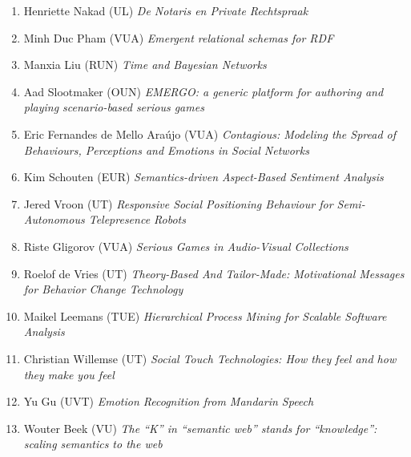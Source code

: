 \begin{multicols}{2}
\begin{scriptsize}
\begin{enumerate}[leftmargin=*,noitemsep,topsep=0pt,parsep=1pt,partopsep=0pt]
{}\item Henriette Nakad (UL) \textit{De Notaris en Private Rechtspraak 
}\item Minh Duc Pham (VUA) \textit{Emergent relational schemas for RDF 
}\item Manxia Liu (RUN) \textit{Time and Bayesian Networks 
}\item Aad Slootmaker (OUN) \textit{EMERGO: a generic platform for authoring and playing scenario-based serious games
}\item Eric Fernandes de Mello Araújo (VUA) \textit{Contagious: Modeling the Spread of Behaviours, Perceptions and Emotions in Social Networks
}\item Kim Schouten (EUR) \textit{Semantics-driven Aspect-Based Sentiment Analysis
}\item Jered Vroon (UT) \textit{Responsive Social Positioning Behaviour for Semi-Autonomous Telepresence Robots
}\item Riste Gligorov (VUA) \textit{Serious Games in Audio-Visual Collections
}\item Roelof de Vries (UT) \textit{Theory-Based And Tailor-Made: Motivational Messages for Behavior Change Technology 
}\item Maikel Leemans (TUE) \textit{Hierarchical Process Mining for Scalable Software Analysis}
\item Christian Willemse (UT) \textit{Social Touch Technologies: How they feel and how they make you feel}
\item Yu Gu (UVT) \textit{Emotion Recognition from Mandarin Speech}
\item Wouter Beek (VU) \textit{The ``K'' in ``semantic web'' stands for ``knowledge'': scaling semantics to the web}
\end{enumerate}	



\end{scriptsize}
\end{multicols}
